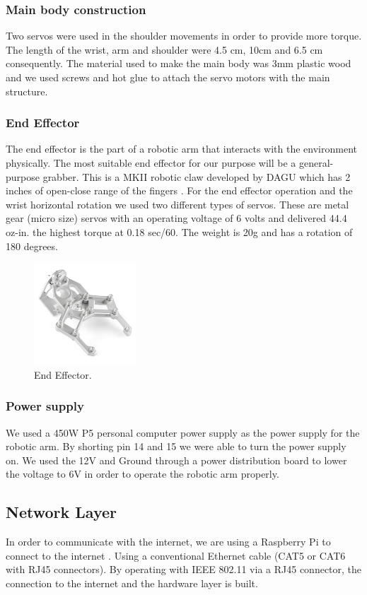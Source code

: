 \documentclass[conference]{IEEEtran}
\begin{document}
\subsubsection{Main body construction}
Two servos were used in the shoulder movements in order to provide more torque. The length of the wrist, arm and shoulder were 4.5 cm, 10cm and 6.5 cm consequently. The material used to make the main body was 3mm plastic wood and we used screws and hot glue to attach the servo motors with the main structure.

\subsubsection{End Effector}
The end effector is the part of a robotic arm that interacts with the environment physically. The most suitable end effector for our purpose will be a general-purpose grabber. This is a MKII robotic claw developed by DAGU which has 2 inches of open-close range of the fingers \cite{eighteen}. For the end effector operation and the wrist horizontal rotation we used two different types of servos. These are metal gear (micro size) servos with an operating voltage of 6 volts and delivered 44.4 oz-in. the highest torque at 0.18 sec/60. The weight is 20g and has a rotation of 180 degrees.
\begin{figure}[ht!] %
 \centering
 \includegraphics[width=1.5in]{Picture4.png}
 \caption{End Effector.}
 \label{endEffector}
 \end{figure}


\subsubsection{Power supply}
We used a 450W P5 personal computer power supply as the power supply for the robotic arm. By shorting pin 14 and 15 we were able to turn the power supply on. We used the 12V and Ground through a power distribution board to lower the voltage to 6V in order to operate the robotic arm properly.

\subsection{Network Layer}
In order to communicate with the internet, we are using a Raspberry Pi to connect to the internet \cite{seventeen}. Using a conventional Ethernet cable (CAT5 or CAT6 with RJ45 connectors). By operating with IEEE 802.11 via a RJ45 connector, the connection to the internet and the hardware layer is built.
\end{document}
